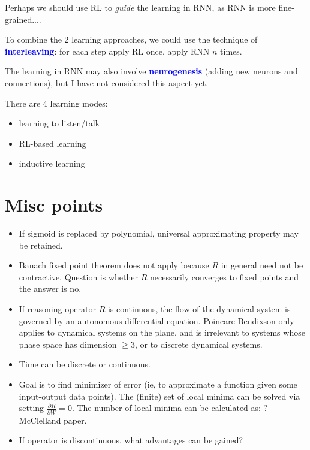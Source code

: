 \documentclass[orivec]{llncs}
\newcommand{\emp}[1]{\textbf{\textcolor{blue}{#1}}}
\begin{document}
Perhaps we should use RL to \textit{guide} the learning in RNN, as RNN is more fine-grained....

To combine the 2 learning approaches, we could use the technique of \emp{interleaving}: for each step apply RL once, apply RNN $n$ times.


The learning in RNN may also involve \emp{neurogenesis} (adding new neurons and connections), but I have not considered this aspect yet.


There are 4 learning modes:
\begin{itemize}
\item learning to listen/talk
\item RL-based learning
\item inductive learning
\end{itemize}

\section{Misc points}

\begin{itemize}
\item If sigmoid is replaced by polynomial, universal approximating property may be retained.

\item Banach fixed point theorem does not apply because $R$ in general need not be contractive.  Question is whether $R$ necessarily converges to fixed points and the answer is no.

\item If reasoning operator $R$ is continuous, the flow of the dynamical system is governed by an autonomous differential equation.  Poincare-Bendixson only applies to dynamical systems on the plane, and is irrelevant to systems whose phase space has dimension $\geq 3$, or to discrete dynamical systems.

\item Time can be discrete or continuous.

\item Goal is to find minimizer of error (ie, to approximate a function given some input-output data points).  The (finite) set of local minima can be solved via setting $\frac{\partial R}{\partial W} = 0$.  The number of local minima can be calculated as: ?  McClelland paper.

\item If operator is discontinuous, what advantages can be gained?
\end{itemize}
\end{document}
